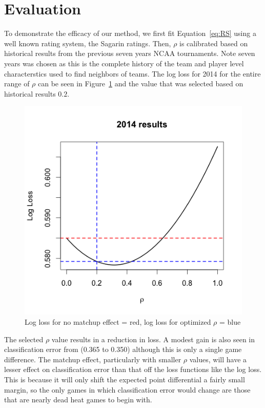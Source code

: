 \section{Evaluation}
To demonstrate the efficacy of our method, we first fit Equation~\ref{eq:RS} using a well known rating system, the Sagarin ratings.  Then, $\rho$ is calibrated based on historical results from the previous seven years NCAA tournaments.  Note seven years was chosen as this is the complete history of the team and player level characterstics used to find neighbors of teams.   The log loss for 2014 for the entire range of $\rho$ can be seen in Figure~\ref{fig:result} and the value that was selected based on historical results $0.2$.
\begin{figure}[h]
\centering
\includegraphics[width=.7\textwidth]{results_2014.png}
\caption{Log loss for no matchup effect = red, log loss for optimized $\rho$ = blue}
\label{fig:result}
\end{figure}

The selected $\rho$ value results in a reduction in loss.  A modest gain is also seen in classification error from (0.365 to 0.350) although this is only a single game difference.  The matchup effect, particularly with smaller $\rho$ values, will have a lesser effect on classification error than that off the loss functions like the log loss.  This is because it will only shift the expected point differential a fairly small margin, so the only games in which classification error would change are those that are nearly dead heat games to begin with.

